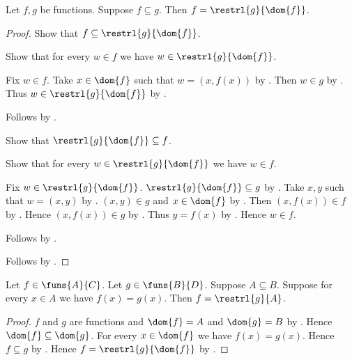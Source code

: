 \begin{proposition}\label{subfunction_eq_restrl}
    Let $f,g$ be functions.
    Suppose $f\subseteq g$.
    Then $f=\restrl{g}{\dom{f}}$.
\end{proposition}
\begin{proof}
    Show that $f\subseteq\restrl{g}{\dom{f}}$.
    \begin{subproof}
        Show that for every $w\in f$ we have
            $w\in\restrl{g}{\dom{f}}$.
        \begin{subproof}
            Fix $w\in f$.
            Take $x\in\dom{f}$ such that $w=(x,f(x))$
                by .
            Then $w\in g$ by .
            Thus $w\in\restrl{g}{\dom{f}}$ by .
        \end{subproof}
        Follows by .
    \end{subproof}

    Show that $\restrl{g}{\dom{f}}\subseteq f$.
    \begin{subproof}
        Show that for every $w\in\restrl{g}{\dom{f}}$ we have $w\in f$.
        \begin{subproof}
            Fix $w\in\restrl{g}{\dom{f}}$.
            $\restrl{g}{\dom{f}}\subseteq g$ by .
            Take $x,y$ such that $w=(x,y)$ by .
            $(x,y)\in g$ and $x\in\dom{f}$ by .
            Then $(x,f(x))\in f$ by .
            Hence $(x,f(x))\in g$ by .
            Thus $y=f(x)$ by .
            Hence $w\in f$.
        \end{subproof}
        Follows by .
    \end{subproof}
    Follows by .
\end{proof}

\begin{theorem}\label{function_eq_restriction_from_agreement}
    Let $f\in\funs{A}{C}$.
    Let $g\in\funs{B}{D}$.
    Suppose $A\subseteq B$.
    Suppose for every $x\in A$ we have $f(x)=g(x)$.
    Then $f=\restrl{g}{A}$.
\end{theorem}
\begin{proof}
    $f$ and $g$ are functions and
        $\dom{f}=A$ and $\dom{g}=B$ by
        .
    Hence $\dom{f}\subseteq\dom{g}$.
    For every $x\in\dom{f}$ we have $f(x)=g(x)$.
    Hence $f\subseteq g$ by .
    Hence $f=\restrl{g}{\dom{f}}$ by
        .
\end{proof}

